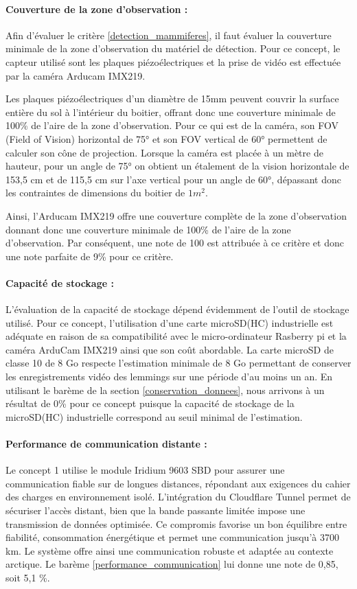 \paragraph{Couverture de la zone d'observation :}
\label{zone_observation1}
Afin d’évaluer le critère \ref{detection_mammiferes}, il faut évaluer la couverture minimale de la zone d’observation du matériel de détection. 
Pour ce concept, le capteur utilisé sont les plaques piézoélectriques et la prise de vidéo est effectuée par la caméra Arducam IMX219.  

\bigskip
Les plaques piézoélectriques d’un diamètre de 15mm peuvent couvrir la surface entière du sol à l’intérieur du boitier, offrant donc une couverture minimale de 100\% de l’aire de la zone d’observation. 
Pour ce qui est de la caméra, son FOV (Field of Vision) horizontal de 75° et son FOV vertical de 60° permettent de calculer son cône de projection. Lorsque la caméra est placée à un mètre de hauteur, 
pour un angle de 75° on obtient un étalement de la vision horizontale de 153,5 cm et de 115,5 cm sur l’axe vertical pour un angle de 60°, dépassant donc les contraintes de dimensions du boitier de $1 m^2$. 

\bigskip
Ainsi, l’Arducam IMX219 offre une couverture complète de la zone d’observation donnant donc une couverture minimale de 100\% de l’aire de la zone d’observation. Par conséquent, 
une note de 100 est attribuée à ce critère et donc une note parfaite de 9\% pour ce critère.


\paragraph{Capacité de stockage :}
L’évaluation de la capacité de stockage dépend évidemment de l’outil de stockage utilisé. Pour ce concept, l’utilisation d’une carte microSD(HC) industrielle est adéquate en raison de sa compatibilité avec le micro-ordinateur Rasberry pi et la caméra ArduCam IMX219 ainsi que son coût abordable.  
La carte microSD de classe 10 de 8 Go respecte l’estimation minimale de 8 Go permettant de conserver les enregistrements vidéo des lemmings sur une période d’au moins un an. En utilisant le barème de la section \ref{conservation_donnees}, nous arrivons à un résultat de 0\% pour ce concept puisque la capacité de stockage de la microSD(HC) industrielle correspond au seuil minimal de l’estimation. 

\paragraph{Performance de communication distante :}
Le concept 1 utilise le module Iridium 9603 SBD pour assurer une communication fiable sur de longues distances, répondant aux exigences du cahier des charges en environnement isolé.
L’intégration du Cloudflare Tunnel permet de sécuriser l’accès distant, bien que la bande passante limitée impose une transmission de données optimisée.
Ce compromis favorise un bon équilibre entre fiabilité, consommation énergétique et permet une communication jusqu'à 3700 km.
Le système offre ainsi une communication robuste et adaptée au contexte arctique. Le barème \ref{performance_communication} lui donne une note de 0,85, soit 5,1 \%. 


